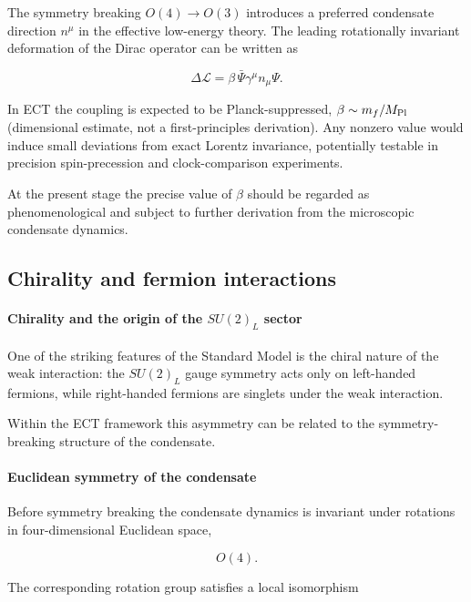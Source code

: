 \documentclass[11pt,a4paper]{article}
\numberwithin{equation}{section}
\begin{document}
The symmetry breaking $O(4)\rightarrow O(3)$ introduces a preferred
condensate direction $n^\mu$ in the effective low-energy theory.  The
leading rotationally invariant deformation of the Dirac operator can be
written as

\begin{equation}
\Delta\mathcal{L}
=
\beta\,\bar{\Psi}\gamma^\mu n_\mu \Psi .
\end{equation}

In ECT the coupling is expected to be Planck-suppressed,
$\beta\sim m_f/M_{\rm Pl}$ (dimensional estimate, not
a first-principles derivation). Any nonzero value would induce small deviations
from exact Lorentz invariance, potentially testable in precision
spin-precession and clock-comparison experiments.

At the present stage the precise value of $\beta$ should be regarded as
phenomenological and subject to further derivation from the microscopic
condensate dynamics.

\subsection{Chirality and fermion interactions}


\paragraph{Chirality and the origin of the $SU(2)_L$ sector}

One of the striking features of the Standard Model is the chiral nature
of the weak interaction: the $SU(2)_L$ gauge symmetry acts only on
left-handed fermions, while right-handed fermions are singlets under
the weak interaction.

Within the ECT framework this asymmetry can be related to the
symmetry-breaking structure of the condensate.

\paragraph{Euclidean symmetry of the condensate}

Before symmetry breaking the condensate dynamics is invariant under
rotations in four-dimensional Euclidean space,

\begin{equation}
O(4).
\end{equation}

The corresponding rotation group satisfies a local isomorphism
\end{document}
